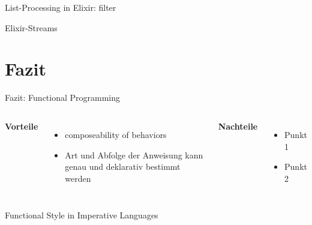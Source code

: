 \documentclass[compress]{beamer}
\begin{document}
  \begin{frame}{List-Processing in Elixir: filter}
  \end{frame}

  \begin{frame}{Elixir-Streams}
  \end{frame}

\section{Fazit}
  \begin{frame}{Fazit: Functional Programming}
    \begin{columns}[c]
      \textbf{Vorteile}
      \begin{itemize}
        \item composeability of behaviors
        \item Art und Abfolge der Anweisung kann genau und deklarativ bestimmt werden
      \end{itemize}
      \textbf{Nachteile}
      \begin{itemize}
        \item Punkt 1
        \item Punkt 2
      \end{itemize}
    \end{columns}
  \end{frame}
  
  \begin{frame}{Functional Style in Imperative Languages}
  \end{frame}
\end{document}
